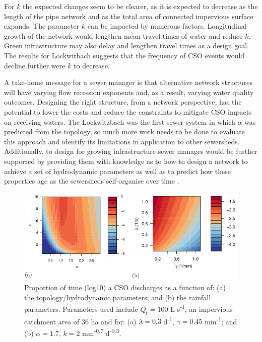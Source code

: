 \documentclass{agujournal2018}
\begin{document}
For $k$ the expected changes seem to be clearer, as it is expected to decrease as the length of the pipe network and as the total area of connected impervious surface expands.  The parameter $k$ can be impacted by numerous factors. Longitudinal growth of the network would lengthen mean travel times of water and reduce $k$. Green infrastructure may also delay and lengthen travel times as a design goal. The results for Lockwitbach suggests that the frequency of CSO events would decline further were $k$ to decrease.  

A take-home message for a sewer manager is that alternative network structures will have varying flow recession exponents and, as a result, varying water quality outcomes. Designing the right structure, from a network perspective, has the potential to lower the costs and reduce the constraints to mitigate CSO impacts on receiving waters. The Lockwitzbach was the first sewer system in which $\alpha$ was predicted from the topology, so much more work needs to be done to evaluate this approach and identify its limitations in application to other sewersheds. Additionally, to design for growing infrastructure sewer manages would be further supported by providing them with knowledge as to how to design a network to achieve a  set of hydrodynamic parameters as well as to predict how these properties age as the sewersheds self-organise over time \citep{Semadeni_Davies_2008}.

\begin{figure}[ht]
 \centering
 \includegraphics[width=30pc]{Fig8.pdf}
 \caption{Proportion of time (log10) a CSO discharges as a function of: (a) the topology/hydrodynamic parameters; and (b) the rainfall parameters. Parameters used include $Q_t = 100$ L s\textsuperscript{-1}, an impervious catchment area of 36 ha and for: (a) $\lambda = 0.3$ d\textsuperscript{-1}, $\gamma = 0.45$ mm\textsuperscript{-1}; and (b) $\alpha = 1.7$, $k = 2$  mm\textsuperscript{-0.7} d\textsuperscript{-0.3}.}
 \label{figeight}
 \end{figure}
 
\end{document}
